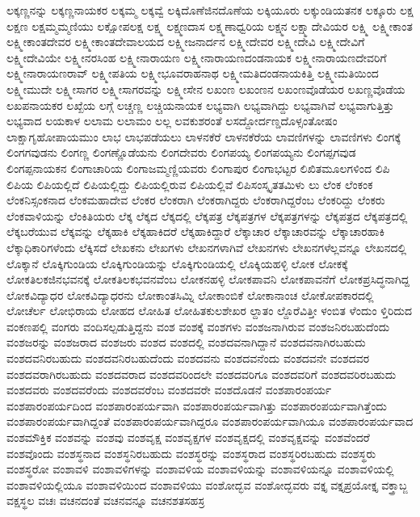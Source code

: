 {ಲಕ್ಕಣ್ಣನನ್ನು
ಲಕ್ಕಣ್ಣನಾಯಕರ
ಲಕ್ಕಮ್ಮ
ಲಕ್ಕವ್ವೆ
ಲಕ್ಕಿದೊಣೆಜಿನದೊಣೆಯ
ಲಕ್ಕಿಯೂರು
ಲಕ್ಕುಂಡಿಯತನಕ
ಲಕ್ಕೂರು
ಲಕ್ಷ
ಲಕ್ಷಣ
ಲಕ್ಷಮ್ಮಮ್ಮಣಿಯು
ಲಕ್ಷೋಪಲಕ್ಷ
ಲಕ್ಷ್ಮ
ಲಕ್ಷ್ಮಣದಾಸ
ಲಕ್ಷ್ಮಣಾಧ್ವರಿಯ
ಲಕ್ಷ್ಮನ
ಲಕ್ಷ್ಮಾದೇವಿಯರ
ಲಕ್ಷ್ಮಿ
ಲಕ್ಷ್ಮೀಕಾಂತ
ಲಕ್ಷ್ಮೀಕಾಂತದೇವರ
ಲಕ್ಷ್ಮೀಕಾಂತದೇವಾಲಯದ
ಲಕ್ಷ್ಮೀಜನಾರ್ದನ
ಲಕ್ಷ್ಮೀದೇವರ
ಲಕ್ಷ್ಮೀದೇವಿ
ಲಕ್ಷ್ಮೀದೇವಿಗೆ
ಲಕ್ಷ್ಮೀದೇವಿಯೇ
ಲಕ್ಷ್ಮೀನರಸಿಂಹ
ಲಕ್ಷ್ಮೀನಾರಾಯಣ
ಲಕ್ಷ್ಮೀನಾರಾಯಣದಂಡನಾಯಕ
ಲಕ್ಷ್ಮೀನಾರಾಯಣದೇವರಿಗೆ
ಲಕ್ಷ್ಮೀನಾರಾಯಣರಾವ್
ಲಕ್ಷ್ಮೀಪತಿಯ
ಲಕ್ಷ್ಮೀಭೂವರಾಹನಾಥ
ಲಕ್ಷ್ಮೀಮತಿದಂಡನಾಯಕಿತ್ತಿ
ಲಕ್ಷ್ಮೀಮತಿಯಿಂದ
ಲಕ್ಷ್ಮೀಮುದೇ
ಲಕ್ಷ್ಮೀಸಾಗರ
ಲಕ್ಷ್ಮೀಸಾಗರವನ್ನು
ಲಕ್ಷ್ಮೀಸೇನ
ಲಖಂಣ
ಲಖಂಣನ
ಲಖಂಣವೊಡೆಯರ
ಲಖಣ್ಣವೊಡೆಯ
ಲಖಪನಾಯಕರ
ಲಖ್ಖೆಯ
ಲಗ್ಗೆ
ಲಚ್ಚಣ್ಣ
ಲಚ್ಚಿಯನಾಯಕ
ಲಭ್ಯವಾಗಿ
ಲಭ್ಯವಾಗಿದ್ದು
ಲಭ್ಯವಾಗಿವೆ
ಲಭ್ಯವಾಗುತ್ತಿತ್ತು
ಲಭ್ಯವಾದ
ಲಯಕಾಳ
ಲಲಾಮ
ಲಲಾಮಂ
ಲಲ್ಲ
ಲವಕುಶರಂತೆ
ಲಸದ್ದೋರ್ದಣ್ಡದೊಳ್ಸಂತೋಷಂ
ಲಾಕ್ಷಾಗೃಹೋಪಾಯಮುಂ
ಲಾಭ
ಲಾಭಪಡೆಯಲು
ಲಾಳನಕೆರೆ
ಲಾಳನಕೆರೆಯ
ಲಾವಣಿಗಳನ್ನು
ಲಾವಣಿಗಳು
ಲಿಂಗಕ್ಕೆ
ಲಿಂಗಗವುಡನು
ಲಿಂಗಣ್ಣ
ಲಿಂಗಣ್ಣೊಡೆಯನು
ಲಿಂಗದೇವರು
ಲಿಂಗಪಯ್ಯ
ಲಿಂಗಪಯ್ಯನು
ಲಿಂಗಪ್ಪಗವುಡ
ಲಿಂಗಪ್ಪನಾಯಕನ
ಲಿಂಗಾಚಾರಿಯ
ಲಿಂಗಾಜಮ್ಮಣ್ಣಿಯವರು
ಲಿಂಗಾಪುರ
ಲಿಂಗಾಭಟ್ಟರ
ಲಿಖಿತಮೂಲಗಳಿಂದ
ಲಿಪಿ
ಲಿಪಿಯ
ಲಿಪಿಯಲ್ಲಿದೆ
ಲಿಪಿಯಲ್ಲಿದ್ದು
ಲಿಪಿಯಲ್ಲಿರುವ
ಲಿಪಿಯಲ್ಲಿವೆ
ಲಿಪಿಸಂಸ್ಕೃತತಮಿಳು
ಲು
ಲೆಂಕ
ಲೆಂಕಂಕ
ಲೆಂಕನಿಸ್ಸಂಕನಾದ
ಲೆಂಕಮಹಾದೇವ
ಲೆಂಕರ
ಲೆಂಕರಾಗಿ
ಲೆಂಕರಾಗಿದ್ದರು
ಲೆಂಕರಾಗಿದ್ದರೆಂಬ
ಲೆಂಕರಿದ್ದು
ಲೆಂಕರು
ಲೆಂಕವಾಳಿಯನ್ನು
ಲೆಂಕಿತಿಯರು
ಲೆಕ್ಕ
ಲೆಕ್ಕದ
ಲೆಕ್ಕದಲ್ಲಿ
ಲೆಕ್ಕಪತ್ರ
ಲೆಕ್ಕಪತ್ರಗಳ
ಲೆಕ್ಕಪತ್ರಗಳನ್ನು
ಲೆಕ್ಕಪತ್ರದ
ಲೆಕ್ಕಪತ್ರದಲ್ಲಿ
ಲೆಕ್ಕಬರೆಯುವ
ಲೆಕ್ಕವನ್ನು
ಲೆಕ್ಕಹಾಕಿ
ಲೆಕ್ಕಹಾಕಿದರೆ
ಲೆಕ್ಕಹಾಕಿದ್ದಾರೆ
ಲೆಕ್ಕಾಚಾರ
ಲೆಕ್ಕಾಚಾರವನ್ನು
ಲೆಕ್ಕಾಚಾರಹಾಕಿ
ಲೆಕ್ಕಾಧಿಕಾರಿಗಳೆಂದು
ಲೆಕ್ಕಿಸದೆ
ಲೇಖಕನು
ಲೇಖಗಳು
ಲೇಖನಗಳಾಗಿವೆ
ಲೇಖನಗಳು
ಲೇಖನಗಳೆಲ್ಲವನ್ನೂ
ಲೇಖನದಲ್ಲಿ
ಲೊಕ್ಕಾನೆ
ಲೊಕ್ಕಿಗುಂಡಿಯ
ಲೊಕ್ಕಿಗುಂಡಿಯನ್ನು
ಲೊಕ್ಕಿಗುಂಡಿಯಲ್ಲಿ
ಲೊಕ್ಕಿಯಹಳ್ಳಿ
ಲೋಕ
ಲೋಕಕ್ಕೆ
ಲೋಕತಿಲಕಜಿನಭವನಕ್ಕೆ
ಲೋಕತಿಲಕಭವನವೆಂಬ
ಲೋಕನಹಳ್ಳಿ
ಲೋಕಪಾವನಿ
ಲೋಕಪಾವನೆಗೆ
ಲೋಕಪ್ರಸಿದ್ಧನಾಗಿದ್ದ
ಲೋಕವಿದ್ಯಾಧರ
ಲೋಕವಿದ್ಯಾಧರನು
ಲೋಕಾಂತಸಿಮ್ನಿ
ಲೋಕಾಂಬಿಕೆ
ಲೋಕಾನಾಂಚ
ಲೋಕೋಪಕಾರದಲ್ಲಿ
ಲೋಚೆರ್ಲ
ಲೋಭಿರಾಯ
ಲೋಹದ
ಲೋಹಿತ
ಲೋಹಿತಕುಲಶೇಖರ
ಲ್ದಾತಂ
ಲ್ದೊರೆವಿತ್ತೀ
ಳಂಬಿತ
ಳೆಂದುಂ
ಳ್ತಿರಿದುದ
ವಂಕಣಪಲ್ಲಿ
ವಂಗರು
ವಂದಿಸಲ್ಪಡುತ್ತಿದ್ದನು
ವಂಶ
ವಂಶಕ್ಕೆ
ವಂಶಗಳು
ವಂಶಜನಾಗಿರುವ
ವಂಶಜನಿರಬಹುದೆಂದು
ವಂಶಜರನ್ನು
ವಂಶಜರಾದ
ವಂಶಜರು
ವಂಶದ
ವಂಶದಲ್ಲಿ
ವಂಶದವನಾಗಿದ್ದಾನೆ
ವಂಶದವನಾಗಿರಬಹುದು
ವಂಶದವನಿರಬಹುದು
ವಂಶದವನಿರಬಹುದೆಂದು
ವಂಶದವನು
ವಂಶದವನೆಂದು
ವಂಶದವನೇ
ವಂಶದವರ
ವಂಶದವರಾಗಿರಬಹುದು
ವಂಶದವರಾದ
ವಂಶದವರಿಂದಲೇ
ವಂಶದವರಿಗೂ
ವಂಶದವರಿಗೆ
ವಂಶದವರಿರಬಹುದು
ವಂಶದವರು
ವಂಶದವರೆಂದು
ವಂಶದವರೆಂಬ
ವಂಶದವರೇ
ವಂಶದೊಡನೆ
ವಂಶಪಾರಂಪರ್ಯ
ವಂಶಪಾರಂಪರ್ಯದಿಂದ
ವಂಶಪಾರಂಪರ್ಯವಾಗಿ
ವಂಶಪಾರಂಪರ್ಯವಾಗಿತ್ತು
ವಂಶಪಾರಂಪರ್ಯವಾಗಿತ್ತೆಂದು
ವಂಶಪಾರಂಪರ್ಯವಾಗಿದ್ದಂತೆ
ವಂಶಪಾರಂಪರ್ಯವಾಗಿದ್ದರೂ
ವಂಶಪಾರಂಪರ್ಯವಾಗಿಯೂ
ವಂಶಪಾರಂಪರ್ಯವಾದ
ವಂಶಮೌಕ್ತಿಕ
ವಂಶವನ್ನು
ವಂಶವು
ವಂಶವೃಕ್ಷ
ವಂಶವೃಕ್ಷಗಳ
ವಂಶವೃಕ್ಷದಲ್ಲಿ
ವಂಶವೃಕ್ಷವನ್ನು
ವಂಶವೆಂದರೆ
ವಂಶವೊಂದು
ವಂಶಸ್ಥನಾದ
ವಂಶಸ್ಥನಿರಬಹುದು
ವಂಶಸ್ಥರನ್ನು
ವಂಶಸ್ಥರಾದ
ವಂಶಸ್ಥರಿರಬಹುದು
ವಂಶಸ್ಥರು
ವಂಶಸ್ಥರೋ
ವಂಶಾವಳಿ
ವಂಶಾವಳಿಗಳನ್ನು
ವಂಶಾವಳಿಯ
ವಂಶಾವಳಿಯನ್ನು
ವಂಶಾವಳಿಯನ್ನೂ
ವಂಶಾವಳಿಯಲ್ಲಿ
ವಂಶಾವಳಿಯಲ್ಲಿಯೂ
ವಂಶಾವಳಿಯಿಂದ
ವಂಶಾವಳಿಯು
ವಂಶೋದ್ಭವ
ವಂಶೋದ್ಭವರು
ವಕ್ತೃ
ವಕ್ತೃಪ್ರಯೋಕ್ತೃ
ವಕ್ತ್ರಾಬ್ಜ
ವಕ್ಷಸ್ಥಲ
ವಚಃ
ವಚನದಂತೆ
ವಚನವನ್ನೂ
ವಚನಶತಸಹಸ್ರ
}
